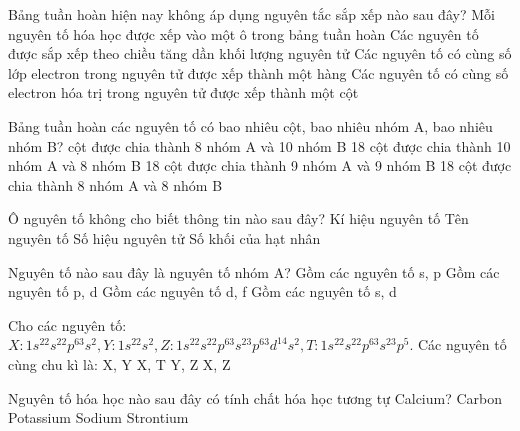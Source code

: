\documentclass[Main_HOA10.tex]{subfiles}
\begin{document}
\begin{ex}%
	Bảng tuần hoàn hiện nay không áp dụng nguyên tắc sắp xếp nào sau đây?
	\choice
	{Mỗi nguyên tố hóa học được xếp vào một ô trong bảng tuần hoàn}
	{Các nguyên tố được sắp xếp theo chiều tăng dần khối lượng nguyên tử}
	{Các nguyên tố có cùng số lớp electron trong nguyên tử được xếp thành một hàng}
	{Các nguyên tố có cùng số electron hóa trị trong nguyên tử được xếp thành một cột}
\end{ex}
\begin{ex}%
	Bảng tuần hoàn các nguyên tố có bao nhiêu cột, bao nhiêu nhóm A, bao nhiêu nhóm B?
	\choice
	{ cột được chia thành 8 nhóm A và 10 nhóm B}
	{18 cột được chia thành 10 nhóm A và 8 nhóm B}
	{18 cột được chia thành 9 nhóm A và 9 nhóm B}
	{18 cột được chia thành 8 nhóm A và 8 nhóm B}
\end{ex}
\begin{ex}%
	Ô nguyên tố không cho biết thông tin nào sau đây?
	\choice
	{Kí hiệu nguyên tố}
	{Tên nguyên tố}
	{Số hiệu nguyên tử}
	{\True Số khối của hạt nhân}
\end{ex}
\begin{ex}%
	Nguyên tố nào sau đây là nguyên tố nhóm A?
	\choice
	{\True Gồm các nguyên tố s, p}
	{Gồm các nguyên tố p, d}
	{Gồm các nguyên tố d, f}
	{Gồm các nguyên tố s, d}
\end{ex}
\begin{ex}%
	Cho các nguyên tố: $X: 1s^22s^22p^63s^2, Y: 1s^22s^2, Z: 1s^22s^22p^63s^23p^63d^14s^2, T: 1s^22s^22p^63s^23p^5.$ Các nguyên tố cùng chu kì là:
	\choice
	{X, Y}
	{\True X, T}
	{Y, Z}
	{X, Z}
\end{ex}
\begin{ex}%
	Nguyên tố hóa học nào sau đây có tính chất hóa học tương tự Calcium?
	\choice
	{Carbon}
	{Potassium}
	{Sodium}
	{\True Strontium}
\end{ex}
\end{document}
